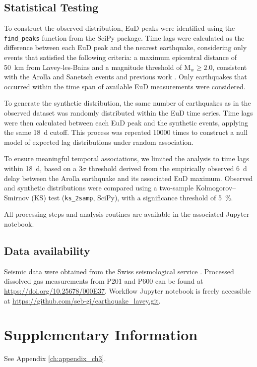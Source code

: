 \subsection{Statistical Testing}\label{methods:stats}
To construct the observed distribution, EuD peaks were identified using the \texttt{find\_peaks} function from the SciPy package.
Time lags were calculated as the difference between each EuD peak and the nearest earthquake, considering only events that satisfied the following criteria: a maximum epicentral distance of \SI{50}{\kilo\meter} from Lavey-les-Bains and a magnitude threshold of M$_w \geq 2.0$, consistent with the Arolla and Sanetsch events and previous work \citep{chiodini2020co2}.
Only earthquakes that occurred within the time span of available EuD measurements were considered.

To generate the synthetic distribution, the same number of earthquakes as in the observed dataset was randomly distributed within the EuD time series.
Time lags were then calculated between each EuD peak and the synthetic events, applying the same \SI{18}{\day} cutoff.
This process was repeated \num{10000} times to construct a null model of expected lag distributions under random association.

To ensure meaningful temporal associations, we limited the analysis to time lags within \SI{18}{\day}, based on a 3$\sigma$ threshold derived from the empirically observed \SI{6}{\day} delay between the Arolla earthquake and its associated EuD maximum.
Observed and synthetic distributions were compared using a two-sample Kolmogorov–Smirnov (KS) test (\texttt{ks\_2samp}, SciPy), with a significance threshold of \SI{5}{\percent}.

All processing steps and analysis routines are available in the associated Jupyter notebook.

\subsection{Data availability}
Seismic data were obtained from the Swiss seismological service \citep{sed2025earthquakes}.
Processed dissolved gas measurements from P201 and P600 can be found at \url{https://doi.org/10.25678/000E37}.
Workflow Jupyter notebook is freely accessible at \url{https://github.com/seb-gi/earthquake_lavey.git}.

\section{Supplementary Information}
See Appendix \ref{ch:appendix_ch3}.